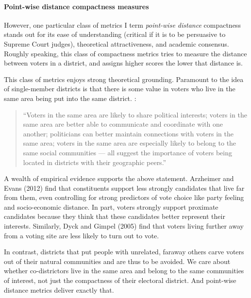 \documentclass[]{article}
\let\oldparagraph\paragraph
\renewcommand{\paragraph}[1]{\oldparagraph{#1}\mbox{}}
\begin{document}
\hypertarget{point-wise-distance-compactness-measures}{%
\paragraph{Point-wise distance compactness
measures}\label{point-wise-distance-compactness-measures}}

However, one particular class of metrics I term \emph{point-wise
distance} compactness stands out for its ease of understanding (critical
if it is to be persuasive to Supreme Court judges), theoretical
attractiveness, and academic consensus. Roughly speaking, this class of
compactness metrics tries to measure the distance between voters in a
district, and assigns higher scores the lower that distance is.

This class of metrics enjoys strong theoretical grounding. Paramount to
the idea of single-member districts is that there is some value in
voters who live in the same area being put into the same district.
\cite{er2019}:

\begin{quote}
``Voters in the same area are likely to share political interests;
voters in the same area are better able to communicate and coordinate
with one another; politicians can better maintain connections with
voters in the same area; voters in the same area are especially likely
to belong to the same social communities --- all suggest the importance
of voters being located in districts with their geographic peers.''
\end{quote}

A wealth of empirical evidence supports the above statement. Arzheimer
and Evans (2012) find that constituents support less strongly candidates
that live far from them, even controlling for strong predictors of vote
choice like party feeling and socio-economic distance. In part, voters
strongly support proximate candidates because they think that these
candidates better represent their interests. Similarly, Dyck and Gimpel
(2005) find that voters living further away from a voting site are less
likely to turn out to vote.

In contrast, districts that put people with unrelated, faraway others
carve voters out of their natural communities and are thus to be
avoided. We care about whether co-districtors live in the same area and
belong to the same communities of interest, not just the compactness of
their electoral district. And point-wise distance metrics deliver
exactly that.
\end{document}
